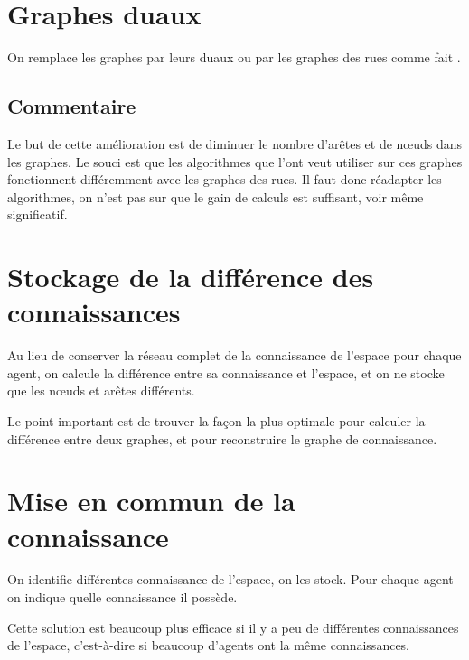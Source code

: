 \documentclass[a4paper]{article}
\begin{document}
\section{Graphes duaux}

On remplace les graphes par leurs duaux ou par les graphes des rues comme fait
\cite{porta2005}.

  \subsection{Commentaire}

Le but de cette amélioration est de diminuer le nombre d'arêtes et de nœuds dans
les graphes. Le souci est que les algorithmes que l'ont veut utiliser sur ces
graphes fonctionnent différemment avec les graphes des rues. Il faut donc
réadapter les algorithmes, on n'est pas sur que le gain de calculs est
suffisant, voir même significatif.

\section{Stockage de la différence des connaissances}

Au lieu de conserver la réseau complet de la connaissance de l'espace pour
chaque agent, on calcule la différence entre sa connaissance et l'espace, et
on ne stocke que les nœuds et arêtes différents.

Le point important est de trouver la façon la plus optimale pour calculer la
différence entre deux graphes, et pour reconstruire le graphe de connaissance.

\section{Mise en commun de la connaissance}

On identifie différentes connaissance de l'espace, on les
stock. Pour chaque agent on indique quelle connaissance il possède.

Cette solution est beaucoup plus efficace si il y a peu de différentes
connaissances de l'espace, c'est-à-dire si beaucoup d'agents ont la même
connaissances.

\begin{figure}
\end{figure}
\end{document}

